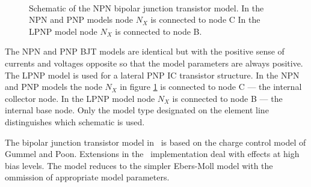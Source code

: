 %
%
  
\begin{figure}[h]
\centering
\ 
\caption[Schematic of bipolar junction transistor model]{Schematic of the NPN
bipolar junction transistor model.
In the NPN and PNP models node $N_X$ is connected to node C
In the LPNP model node $N_X$ is connected to node B.
\label{bjt:model}}
\end{figure}

The NPN and PNP BJT models are identical but with the positive sense of
currents and voltages opposite so that
the model parameters are always positive.
The LPNP model is used for a lateral PNP IC transistor structure.
In the NPN and PNP models the node $N_X$ in figure \ref{bjt:model}
is connected to node C --- the internal collector node.
In the LPNP model node $N_X$
is connected to node B --- the internal base node.
Only the model type designated on the element line distinguishes which
schematic is used.

The bipolar junction transistor model in \spice\  is based on the  charge
control model of Gummel and Poon. Extensions in the \spice\ implementation
deal with effects at high bias levels.  The model reduces to the simpler
Ebers-Moll model  with the ommission of appropriate model parameters.

